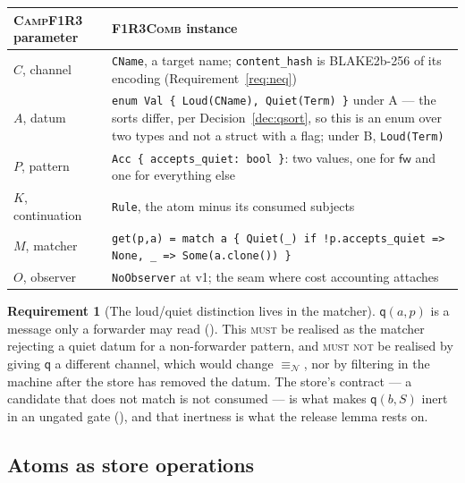\documentclass[11pt,a4paper]{article}
\newcommand{\code}[1]{\texttt{#1}}
\newcommand{\Comb}{\textsc{F1R3Comb}}
\newcommand{\Camp}{\textsc{CampF1R3}}
\newcommand{\MUST}{\textsc{must}}
\newcommand{\MUSTNOT}{\textsc{must not}}
\newcommand{\nequiv}{\equiv_{\mathcal{N}}}
\newcommand{\fw}{\mathsf{fw}}
\newcommand{\qq}{\mathsf{q}}
\theoremstyle{definition}
\newtheorem{requirement}[definition]{Requirement}
\theoremstyle{plain}
\begin{document}
\begin{center}
\begin{tabularx}{\linewidth}{@{}l>{\raggedright\arraybackslash}X@{}}
\toprule
\Camp{} parameter & \Comb{} instance\\
\midrule
$C$, channel & \code{CName}, a target name; \code{content\_hash} is
BLAKE2b-256 of its encoding (Requirement~\ref{req:neq})\\
$A$, datum & \code{enum Val \{ Loud(CName), Quiet(Term) \}} under A ---
the sorts differ, per Decision~\ref{dec:qsort}, so this is an enum over two
types and not a struct with a flag; under B, \code{Loud(Term)}\\
$P$, pattern & \code{Acc \{ accepts\_quiet: bool \}}: two values, one for
$\fw$ and one for everything else\\
$K$, continuation & \code{Rule}, the atom minus its consumed subjects\\
$M$, matcher & \code{get(p,a) = match a \{ Quiet(\_) if !p.accepts\_quiet =>
None, \_ => Some(a.clone()) \}}\\
$O$, observer & \code{NoObserver} at v1; the seam where cost accounting
attaches\\
\bottomrule
\end{tabularx}
\end{center}

\begin{requirement}[The loud/quiet distinction lives in the matcher]
\label{req:quiet}
$\qq(a,p)$ is a message only a forwarder may read
(\cite[Rem.~3.7]{draft3}). This \MUST{} be realised as the matcher rejecting a
quiet datum for a non-forwarder pattern, and \MUSTNOT{} be realised by giving
$\qq$ a different channel, which would change $\nequiv$, nor by filtering in
the machine after the store has removed the datum. The store's contract --- a
candidate that does not match is not consumed --- is what makes $\qq(b,S)$
inert in an ungated gate (\cite[Lem.~6.5]{draft3}), and that inertness is what
the release lemma rests on.
\end{requirement}

\subsection{Atoms as store operations}
\end{document}
